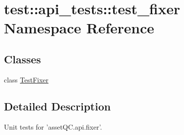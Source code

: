 \hypertarget{namespacetest_1_1api__tests_1_1test__fixer}{\section{test\-:\-:api\-\_\-tests\-:\-:test\-\_\-fixer \-Namespace \-Reference}
\label{d5/d0b/namespacetest_1_1api__tests_1_1test__fixer}
}
\subsection*{\-Classes}
\begin{DoxyCompactItemize}
\item 
class \hyperlink{classtest_1_1api__tests_1_1test__fixer_1_1TestFixer}{\-Test\-Fixer}
\end{DoxyCompactItemize}


\subsection{\-Detailed \-Description}
\begin{DoxyVerb}
Unit tests for 'assetQC.api.fixer'.
\end{DoxyVerb}
 